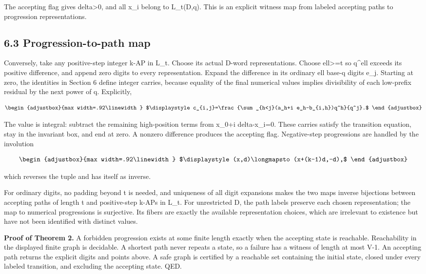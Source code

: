 The accepting flag gives delta\textgreater0, and all x\_i belong to L\_t(D,q). This is an explicit witness map from labeled accepting paths to progression representations.

\subsection{6.3 Progression-to-path map}\label{n02-progression-to-path-map}

Conversely, take any positive-step integer k-AP in L\_t. Choose its actual D-word representations. Choose ell\textgreater=t so q\^{}ell exceeds its positive difference, and append zero digits to every representation. Expand the difference in its ordinary ell base-q digits e\_j. Starting at zero, the identities in Section 6 define integer carries, because equality of the final numerical values implies divisibility of each low-prefix residual by the next power of q. Explicitly,

\[
\begin{adjustbox}{max width=.92\linewidth}
$\displaystyle c_{i,j}=\frac{\sum_{h<j}(a_h+i e_h-b_{i,h})q^h}{q^j}.$
\end{adjustbox}
\]

The value is integral: subtract the remaining high-position terms from x\_0+i delta-x\_i=0. These carries satisfy the transition equation, stay in the invariant box, and end at zero. A nonzero difference produces the accepting flag. Negative-step progressions are handled by the involution

\[
\begin{adjustbox}{max width=.92\linewidth}
$\displaystyle (x,d)\longmapsto(x+(k-1)d,-d),$
\end{adjustbox}
\]

which reverses the tuple and has itself as inverse.

For ordinary digits, no padding beyond t is needed, and uniqueness of all digit expansions makes the two maps inverse bijections between accepting paths of length t and positive-step k-APs in L\_t. For unrestricted D, the path labels preserve each chosen representation; the map to numerical progressions is surjective. Its fibers are exactly the available representation choices, which are irrelevant to existence but have not been identified with distinct values.

\textbf{Proof of Theorem 2.} A forbidden progression exists at some finite length exactly when the accepting state is reachable. Reachability in the displayed finite graph is decidable. A shortest path never repeats a state, so a failure has a witness of length at most V-1. An accepting path returns the explicit digits and points above. A safe graph is certified by a reachable set containing the initial state, closed under every labeled transition, and excluding the accepting state. QED.

